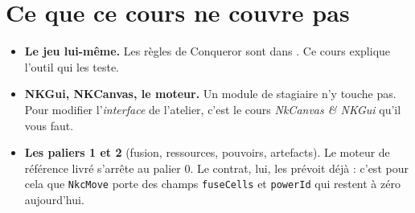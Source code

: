 \section{Ce que ce cours ne couvre pas}

\begin{itemize}
  \item \textbf{Le jeu lui-même.} Les règles de Conqueror sont dans
        . Ce cours explique l'outil qui les teste.
  \item \textbf{NKGui, NKCanvas, le moteur.} Un module de stagiaire n'y touche
        pas. Pour modifier l'\emph{interface} de l'atelier, c'est le cours
        \emph{NkCanvas \& NKGui} qu'il vous faut.
  \item \textbf{Les paliers 1 et 2} (fusion, ressources, pouvoirs, artefacts). Le
        moteur de référence livré s'arrête au palier 0. Le contrat, lui, les
        prévoit déjà : c'est pour cela que \texttt{NkcMove} porte des champs
        \texttt{fuseCells} et \texttt{powerId} qui restent à zéro aujourd'hui.
\end{itemize}
